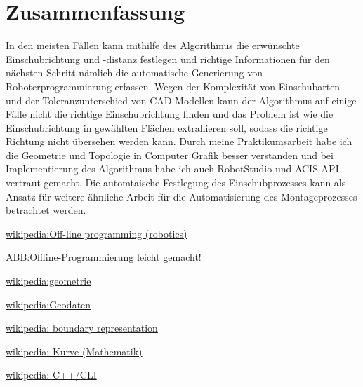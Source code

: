 \documentclass[14pt,a4paper,titlepage]{article}
\begin{document}
	\section{Zusammenfassung}
		In den meisten Fällen kann mithilfe des Algorithmus die erwünschte Einschubrichtung und -distanz festlegen und richtige Informationen für den nächsten Schritt nämlich die automatische Generierung von Roboterprogrammierung erfassen. Wegen der Komplexität von Einschubarten und der Toleranzunterschied von CAD-Modellen kann der Algorithmus auf einige Fälle nicht die richtige Einschubrichtung finden und das Problem ist wie die Einschubrichtung in gewählten Flächen extrahieren soll, sodass die richtige Richtung nicht übersehen werden kann. 
		\bigbreak
		Durch meine Praktikumsarbeit habe ich die Geometrie und Topologie in Computer Grafik besser verstanden und bei Implementierung des Algorithmus habe ich auch RobotStudio und ACIS API vertraut gemacht. Die automtaische Festlegung des Einschubprozesses kann als Ansatz für weitere ähnliche Arbeit für die Automatisierung des Montageprozesses betrachtet werden.
	\pagebreak
	\begin{thebibliography}{1}
		\href{https://en.wikipedia.org/wiki/Off-line_programming_(robotics)}{wikipedia:Off-line programming (robotics)}
		
		\href{https://new.abb.com/products/robotics/de/robotstudio}{ABB:Offline-Programmierung leicht gemacht!}
		
		\href{https://de.wikipedia.org/wiki/Geometrie}{wikipedia:geometrie}
	
		
		\href{https://de.wikipedia.org/wiki/Geodaten#Topologie}{wikipedia:Geodaten}
		
		\href{https://en.wikipedia.org/wiki/Boundary_representation}{wikipedia: boundary representation}
		
		\href{https://de.wikipedia.org/wiki/Kurve_(Mathematik)}{wikipedia: Kurve (Mathematik)}
		
		\href{https://de.wikipedia.org/wiki/C%2B%2B/CLI}{wikipedia: C++/CLI}
	\end{thebibliography}
	\pagebreak
	\listoffigures
	\pagebreak
\end{document}
